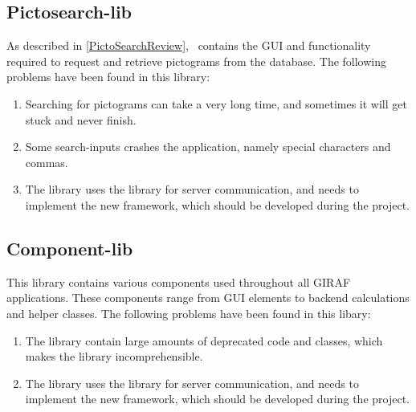 \subsection{Pictosearch-lib}
As described in \autoref{PictoSearchReview}, \plib\ contains the GUI and
functionality required to request and retrieve pictograms from the database. The
following problems have been found in this library:
\begin{enumerate}   
  \item Searching for pictograms can take a very long time,
  and sometimes it
  will get stuck and never finish.
  \item Some search-inputs crashes the application, namely special characters
  and commas.
  \item The library uses the  library for server communication, and needs
  to implement the new  framework, which should be developed during the project.
\end{enumerate}

\subsection{Component-lib}
This library contains various components used throughout all GIRAF applications.
These components range from GUI elements to backend calculations and helper
classes. The following problems have been found in this libary:
\begin{enumerate}
  \item The library contain large amounts of deprecated code and classes, which
  makes the library incomprehensible.
  \item The library uses the  library for server communication, and needs
  to implement the new  framework, which should be developed during the project.
\end{enumerate}